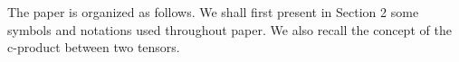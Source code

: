 \documentclass{siamltex}
\newcommand{\1}{\mathbb{1}}
\newcommand{\0}{\mathbb{0}}
\begin{document}
\noindent The paper is organized as follows. We shall first   present in  Section 2 
	some symbols and notations used throughout paper. We also recall the concept of the c-product  between two tensors. 
\end{document}
